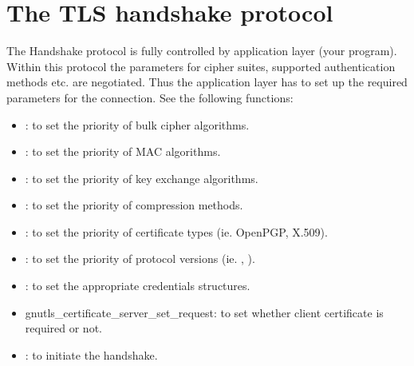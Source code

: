 \section{The TLS handshake protocol}
\label{handshake}

The Handshake protocol is fully controlled by application layer (your 
program). Within this protocol the parameters for cipher suites, supported
authentication methods etc. are negotiated. Thus the application layer
has to set up the required parameters for the connection.
See the following functions:
\begin{itemize}
\item {}:
to set the priority of bulk cipher algorithms.
\item {}:
to set the priority of MAC algorithms.
\item {}:
to set the priority of key exchange algorithms.
\item {}:
to set the priority of compression methods.
\item {}:
to set the priority of certificate types (ie. OpenPGP, X.509).
\item {}:
to set the priority of protocol versions (ie. \sslIII{}, \tlsI).
\item {}: to set the
appropriate credentials structures.
\item {}
{gnutls\_certificate\_server\_set\_request}: to set
whether client certificate is required or not.
\item {}: to initiate the
handshake.
\end{itemize}



